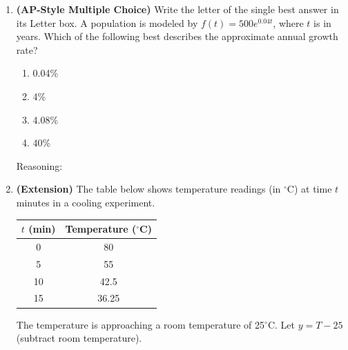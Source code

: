 \documentclass[10pt]{article}
\begin{document}
\begin{enumerate}[itemsep=18pt]
\begin{enumerate}[label=(\alph*), itemsep=8pt]
              \vspace{0.06in}
              $h(n) = $ \smash{\gradedblank[id=hw4c1, type=short, points=1, answer={5 \cdot 9^n}]{8cm}{13pt}} \quad Base: \smash{\gradedblank[id=hw4c2, type=short, points=1, answer={9}]{2cm}{13pt}}
      \end{enumerate}

\item \textbf{(AP-Style Multiple Choice)} Write the letter of the single best answer in its Letter box. A population is modeled by $f(t) = 500 e^{0.04t}$,
      where $t$ is in years. Which of the following best describes the approximate annual growth rate?

      \medskip
      \begin{enumerate}[label=(\Alph*), itemsep=4pt]
        \item 0.04\%
        \item 4\%
        \item 4.08\%
        \item 40\%
      \end{enumerate}

      \vspace{0.06in}
      \leavevmode{}\phantom{Answer:} \gradedblank[id=hw5a, type=choice, points=1, answer=C]{1.5cm}{13pt} \quad Reasoning:
      \rubricbox[1pt]{\gradedblank[id=hw5b, type=rubric, points=2,
  display={$e^{0.04} \approx 1.0408$, a growth factor of 1.0408: about $4.08\%$ per year.}]{\linewidth}{13pt}}

\newpage
\item \textbf{(Extension)} The table below shows temperature readings (in ${}^\circ$C) at time
      $t$ minutes in a cooling experiment.

      \begin{center}
      \renewcommand{\arraystretch}{1.5}
      \begin{tabular}{c|c}
      $t$ (min) & Temperature (${}^\circ$C) \\ \hline
      0  & 80 \\
      5  & 55 \\
      10 & 42.5 \\
      15 & 36.25 \\
      \end{tabular}
      \end{center}

      The temperature is approaching a room temperature of 25${}^\circ$C. Let $y = T - 25$
      (subtract room temperature).


\end{enumerate}
\end{document}
